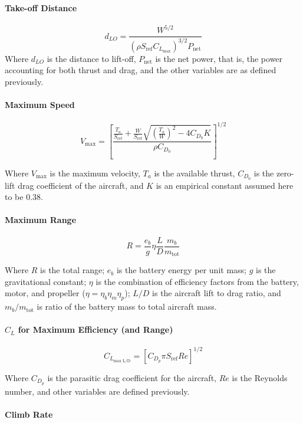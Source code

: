\documentclass[report]{byu-aero}
\begin{document}
\paragraph{Take-off Distance}

\[ d_{LO} = \frac{ W^{5/2} }{ \left( \rho S_\text{ref} C_{L_\text{max}} \right)^{3/2} P_\text{net} } \]
Where \(d_{LO}\) is the distance to lift-off, \(P_\text{net}\) is the net power, that is, the power accounting for both thrust and drag, and the other variables are as defined previously.

\paragraph{Maximum Speed}

\[ V_\text{max} = \left[ \frac{ \frac{T_a}{S_\text{ref}} + \frac{W}{S_\text{ref}}\sqrt{\left(\frac{T_a}{W}\right)^2 - 4C_{D_0}K } }{\rho C_{D_0}} \right]^{1/2} \]

Where \(V_\text{max}\) is the maximum velocity, \(T_a\) is the available thrust, \(C_{D_0}\) is the zero-lift drag coefficient of the aircraft, and \(K\) is an empirical constant assumed here to be 0.38.

\paragraph{Maximum Range}

\[R = \frac{e_b}{g} \eta \frac{L}{D} \frac{m_b}{m_\text{tot}}\]

Where \(R\) is the total range; \(e_b\) is the battery energy per unit mass; \(g\) is the gravitational constant; \(\eta\) is the combination of efficiency factors from the battery, motor, and propeller (\(\eta=\eta_b\eta_m\eta_p\)); \(L/D\) is the aircraft lift to drag ratio, and \(m_b/m_\text{tot}\) is ratio of the battery mass to total aircraft mass.

\paragraph{\(C_L\) for Maximum Efficiency (and Range)}

\[C_{L_\text{max L/D}} = \left[ C_{D_p} \pi S_\text{ref} Re \right]^{1/2}\]

Where \(C_{D_p}\) is the parasitic drag coefficient for the aircraft, \(Re\) is the Reynolds number, and other variables are defined previously.


\paragraph{Climb Rate}
\end{document}
